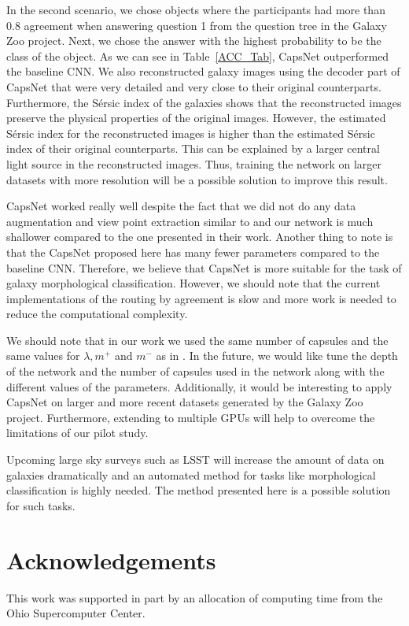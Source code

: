 \documentclass[a4paper,fleqn,usenatbib]{mnras}
\begin{document}
In the second scenario, we chose objects where the participants had more than 0.8 agreement when answering question 1 from the question tree in the Galaxy Zoo project. Next, we chose the answer with the highest probability to be the class of the object. As we can see in Table~\ref{ACC_Tab}, CapsNet outperformed the baseline CNN. We also reconstructed galaxy images using the decoder part of CapsNet that were very detailed and very close to their original counterparts. Furthermore, the S{\'e}rsic index of the galaxies shows that the reconstructed images preserve the physical properties of the original images. However, the estimated S{\'e}rsic index for the reconstructed images is higher than the estimated S{\'e}rsic index of their original counterparts. This can be explained by a larger central light source in the reconstructed images. Thus, training the network on larger datasets with more resolution will be a possible solution to improve this result. 

CapsNet worked really well despite the fact that we did not do any data augmentation and view point extraction similar to \cite{dieleman2015rotation} and our network is much shallower compared to the one presented in their work. Another thing to note is that the CapsNet proposed here has many fewer parameters compared to the baseline CNN. Therefore, we believe that CapsNet is more suitable for the task of galaxy morphological classification. However, we should note that the current implementations of the routing by agreement is slow and more work is needed to reduce the computational complexity. 

We should note that in our work we used the same number of capsules and the same values for $\lambda, m^{+}$ and $m^{-}$ as in \cite{sabour2017dynamic}. In the future, we would like tune the depth of the network and the number of capsules used in the network along with the different values of the parameters. Additionally, it would be interesting to apply CapsNet on larger and more recent datasets generated by the Galaxy Zoo project. Furthermore, extending to multiple GPUs will help to overcome the limitations of our pilot study.  

Upcoming large sky surveys such as LSST will increase the amount of data on galaxies dramatically and an automated method for tasks like morphological classification is highly needed. The method presented here is a possible solution for such tasks.




\section*{Acknowledgements}
This work was supported in part by an allocation of computing time from the Ohio Supercomputer Center. 
\end{document}
